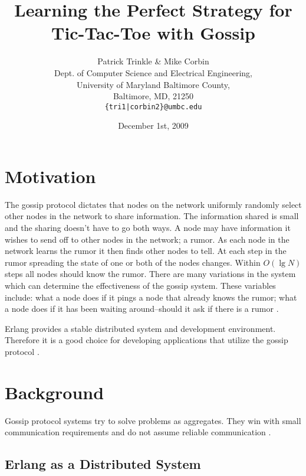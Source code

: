 \documentclass[11pt,twocolumn]{article}
\title{Learning the Perfect Strategy for Tic-Tac-Toe with Gossip}
\author{Patrick Trinkle \& Mike Corbin\\
Dept. of Computer Science and Electrical Engineering,\\
University of Maryland Baltimore County,\\
Baltimore, MD, 21250\\
\texttt{\{tri1|corbin2\}@umbc.edu}}
\date{December 1st, 2009}
\begin{document}

\section{Motivation}

The gossip protocol dictates that nodes on the network uniformly randomly select other nodes in the network to share information.  The information shared is small and the sharing doesn't have to go both ways.  A node may have information it wishes to send off to other nodes in the network; a rumor.  As each node in the network learns the rumor it then finds other nodes to tell.  At each step in the rumor spreading the state of one or both of the nodes changes.  Within $O(\lg N)$ steps all nodes should know the rumor.  There are many variations in the system which can determine the effectiveness of the gossip system.  These variables include: what a node does if it pings a node that already knows the rumor; what a node does if it has been waiting around--should it ask if there is a rumor \cite{Birm2007}.

Erlang provides a stable distributed system and development environment.  Therefore it is a good choice for developing applications that utilize the gossip protocol \cite{Erlang}.

\section{Background}

Gossip protocol systems try to solve problems as aggregates.  They win with small communication requirements and do not assume reliable communication \cite{Birm2007}.

\subsection{Erlang as a Distributed System}
\end{document}
